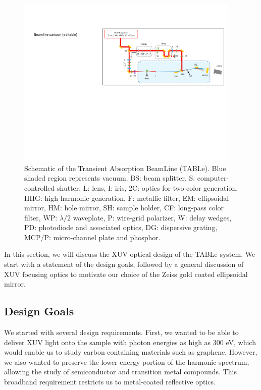 \begin{figure}
	\centering
	\includegraphics[width=0.95\textwidth]{figures/chap2/beamline_schematic.pdf}
	\caption{Schematic of the Transient Absorption BeamLine (TABLe). Blue shaded region represents vacuum. BS: beam splitter, S: computer-controlled shutter, L: lens, I: iris, 2C: optics for two-color generation, HHG: high harmonic generation, F: metallic filter, EM: ellipsoidal mirror, HM: hole mirror, SH: sample holder, CF: long-pass color filter, WP: $\lambda/2$ waveplate, P: wire-grid polarizer, W: delay wedges, PD: photodiode and associated optics, DG: dispersive grating, MCP/P: micro-channel plate and phosphor.}
	\label{fig:beamline_schematic}
\end{figure}

In this section, we will discuss the XUV optical design of the TABLe system. We start with a statement of the design goals, followed by a general discussion of XUV focusing optics to motivate our choice of the Zeiss gold coated ellipsoidal mirror. 

\subsection{Design Goals}

We started with several design requirements. First, we wanted to be able to deliver XUV light onto the sample with photon energies as high as 300 eV, which would enable us to study carbon containing materials such as graphene. However, we also wanted to preserve the lower energy portion of the harmonic spectrum, allowing the study of semiconductor and transition metal compounds. This broadband requirement restricts us to metal-coated reflective optics.

